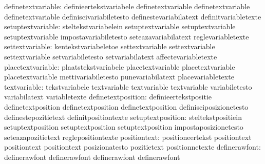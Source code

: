               definetextvariable: definieertekstvariabele          definetextvariable
                                  definetextvariable               definetextvariable
                                  definiscivariabiletesto          definestevariabilatext
                                  definitvariabletexte
               setuptextvariable: steltekstvariabelein             setuptextvariable
                                  setuptextvariable                setuptextvariable
                                  impostavariabiletesto            seteazavariabilatext
                                  reglevariabletexte
                 settextvariable: kentekstvariabeletoe             settextvariable
                                  settextvariable                  settextvariable
                                  setvariabiletesto                setvariabilatext
                                  affectevariabletexte
               placetextvariable: plaatstekstvariabele             placetextvariable
                                  placetextvariable                placetextvariable
                                  mettivariabiletesto              punevariabilatext
                                  placevariabletexte
                    textvariable: tekstvariabele                   textvariable
                                  textvariable                     textvariable
                                  variabiletesto                   variabilatext
                                  variabletexte
              definetextposition: definieertekstpositie            definetextposition
                                  definetextposition               definetextposition
                                  definisciposizionetesto          definestepozitietext
                                  definitpositiontexte
               setuptextposition: steltekstpositiein               setuptextposition
                                  setuptextposition                setuptextposition
                                  impostaposizionetesto            seteazapozitietext
                                  reglepositiontexte
                    positiontext: positioneertekst                 positiontext
                                  positiontext                     positiontext
                                  posizionatesto                   pozitietext
                                  positionnetexte
                   definerawfont: definerawfont                    definerawfont
                                  definerawfont                    definerawfont
